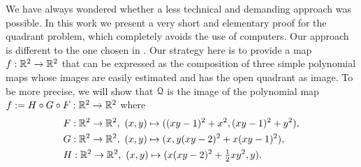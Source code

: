 \documentclass[1p]{elsarticle}
\newcommand{\Qq}{{\EuScript Q}}
\begin{document}
We have always wondered whether a less technical and demanding approach was possible. In this work we present a very short and elementary proof for the quadrant problem, which completely avoids the use of computers. Our approach is different to the one chosen in \citet{fg1}. Our strategy here is to provide a map $f:{\mathbb R}^2\to{\mathbb R}^2$ that can be expressed as the composition of three simple polynomial maps whose images are easily estimated and has the open quadrant as image.  To be more precise, we will show that $\Qq$ is the image of the polynomial map $f:=H\circ G\circ F:{\mathbb R}^2\to{\mathbb R}^2$ where
\begin{align}\label{maps}
&F:{\mathbb R}^2\to{\mathbb R}^2,\ (x,y)\mapsto((xy-1)^2+x^2,(xy-1)^2+y^2),\nonumber\\
&G:{\mathbb R}^2\to{\mathbb R}^2,\  (x,y)\mapsto(x,y(xy-2)^2+x(xy-1)^2),\\
&H:{\mathbb R}^2\to{\mathbb R}^2,\  (x,y)\mapsto(x(xy-2)^2+\tfrac{1}{2}xy^2,y)\nonumber.
\end{align}
\end{document}
